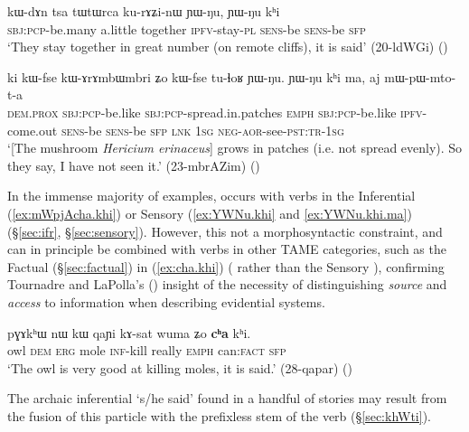 \begin{exe}
\ex \label{ex:YWNu.khi}
\gll kɯ-dɤn tsa tɯtɯrca ku-rɤʑi-nɯ ɲɯ-ŋu, ɲɯ-ŋu kʰi  \\
\textsc{sbj}:\textsc{pcp}-be.many a.little together \textsc{ipfv}-stay-\textsc{pl} \textsc{sens}-be \textsc{sens}-be \textsc{sfp} \\
\glt `They stay together in great number (on remote cliffs), it is said' (20-ldWGi)
()
\end{exe}

\begin{exe}
\ex \label{ex:YWNu.khi.ma}
\gll ki kɯ-fse kɯ-ɤrɤmbɯmbri ʑo kɯ-fse tu-ɬoʁ ɲɯ-ŋu. ɲɯ-ŋu kʰi ma, aj mɯ-pɯ-mto-t-a \\
\textsc{dem}.\textsc{prox} \textsc{sbj}:\textsc{pcp}-be.like \textsc{sbj}:\textsc{pcp}-spread.in.patches \textsc{emph} \textsc{sbj}:\textsc{pcp}-be.like \textsc{ipfv}-come.out \textsc{sens}-be \textsc{sens}-be \textsc{sfp} \textsc{lnk} \textsc{1sg} \textsc{neg}-\textsc{aor}-see-\textsc{pst}:\textsc{tr}-\textsc{1sg} \\
\glt `[The mushroom \textit{Hericium erinaceus}] grows in patches (i.e. not spread evenly). So they say, I have not seen it.' (23-mbrAZim) 	()
\end{exe}

In the immense majority of examples,  occurs with verbs in the Inferential (\ref{ex:mWpjAcha.khi}) or Sensory (\ref{ex:YWNu.khi} and \ref{ex:YWNu.khi.ma}) (§\ref{sec:ifr}, §\ref{sec:sensory}). However, this not a morphosyntactic constraint, and  can in principle be combined with verbs in other TAME categories, such as the Factual (§\ref{sec:factual}) in (\ref{ex:cha.khi}) ( rather than the Sensory ), confirming Tournadre and LaPolla's (\citeyear{tournadre14evidentiality}) insight of the necessity of distinguishing \textit{source} and \textit{access} to information when describing evidential systems.

\begin{exe}
\ex \label{ex:cha.khi}
\gll pɣɤkʰɯ nɯ kɯ qaɲi kɤ-sat wuma ʑo \textbf{cʰa} kʰi. \\
owl \textsc{dem} \textsc{erg} mole \textsc{inf}-kill really \textsc{emph} can:\textsc{fact} \textsc{sfp} \\
\glt `The owl is very good at killing moles, it is said.' (28-qapar)
()
\end{exe}

The archaic inferential  `s/he said' found in a handful of stories may result from the fusion of this particle with the prefixless stem of the verb  (§\ref{sec:khWti}).

